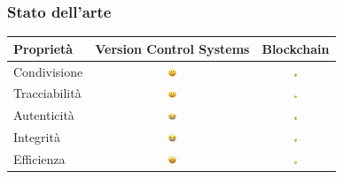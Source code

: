 \documentclass{beamer}
\begin{document}
\begin{frame}
	\frametitle{Stato dell'arte}
	\begin{longtable}{@{}lcc@{}}
		\toprule
		\textbf{Proprietà} & \multicolumn{1}{l}{\textbf{Version Control Systems}} & \multicolumn{1}{l}{\textbf{Blockchain}} \\* \midrule
		\endfirsthead
		\endhead
		\bottomrule
		\endfoot
		\endlastfoot
		Condivisione    & \includegraphics[width=0.05\textwidth]{joy.png}   & \includegraphics[width=0.05\textwidth]{joy2.png} \\
		Tracciabilità  & \includegraphics[width=0.05\textwidth]{joy.png}   & \includegraphics[width=0.05\textwidth]{joy2.png} \\
		Autenticità  & \includegraphics[width=0.05\textwidth]{sad2.png}         & \includegraphics[width=0.05\textwidth]{joy2.png} \\
		Integrità    & \includegraphics[width=0.05\textwidth]{sad2.png}         & \includegraphics[width=0.05\textwidth]{joy2.png} \\
		Efficienza   & \includegraphics[width=0.05\textwidth]{joy2.png} & \includegraphics[width=0.05\textwidth]{sad2.png}         \\

\end{longtable}
\end{frame}
\end{document}
